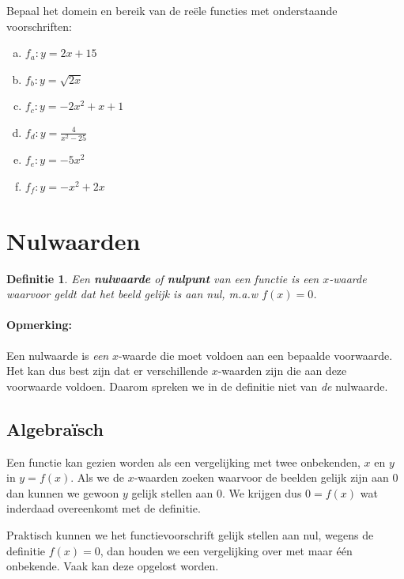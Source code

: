 \documentclass[12pt,twoside]{article}
\newtheorem{definition}{Definitie}
\begin{document}
\begin{oefening}
Bepaal het domein en bereik van de reële functies met onderstaande voorschriften:
\begin{enumerate}[(a)]
  \itemsep0.8em
  \item $\displaystyle f_a : y=2x+15$
  \item $\displaystyle f_b : y=\sqrt{2x}$
  \item $\displaystyle f_c : y=-2x^2+x+1$
  \item $\displaystyle f_d : y=\frac{4}{x^2-25}$
  \item $\displaystyle f_e : y=-5x^2$
  \item $\displaystyle f_f : y=-x^2+2x$
\end{enumerate}
\end{oefening}

\pagebreak
\section{Nulwaarden}

\begin{definition}
Een {\bf nulwaarde} of {\bf nulpunt} van een functie is een $x$-waarde waarvoor geldt dat het beeld gelijk is aan nul, m.a.w $f(x)=0$.
\end{definition}

\paragraph*{Opmerking:} Een nulwaarde is {\em een} $x$-waarde die moet voldoen aan een bepaalde voorwaarde. Het kan dus best zijn dat er verschillende $x$-waarden zijn die aan deze voorwaarde voldoen. Daarom spreken we in de definitie niet van {\em de} nulwaarde.

\subsection{Algebraïsch}

Een functie kan gezien worden als een vergelijking met twee onbekenden, $x$ en $y$ in $y=f(x)$. Als we de $x$-waarden zoeken waarvoor de beelden gelijk zijn aan $0$ dan kunnen we gewoon $y$ gelijk stellen aan $0$. We krijgen dus $0=f(x)$ wat inderdaad overeenkomt met de definitie. 

Praktisch kunnen we het functievoorschrift gelijk stellen aan nul, wegens de definitie $f(x)=0$, dan houden we een vergelijking over met maar één onbekende. Vaak kan deze opgelost worden.
\end{document}

